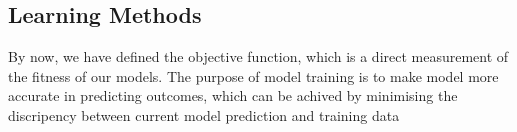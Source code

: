 \subsection {Learning Methods}
By now, we have defined the objective function, which is a direct measurement of the fitness of our models. The purpose of model training is to make model more accurate in predicting outcomes, which can be achived by minimising the discripency between current model prediction and training data